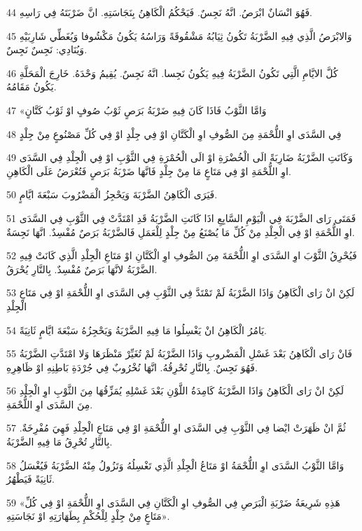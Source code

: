 \par 44 فَهُوَ انْسَانٌ ابْرَصُ. انَّهُ نَجِسٌ. فَيَحْكُمُ الْكَاهِنُ بِنَجَاسَتِهِ. انَّ ضَرْبَتَهُ فِي رَاسِهِ.
\par 45 وَالابْرَصُ الَّذِي فِيهِ الضَّرْبَةُ تَكُونُ ثِيَابُهُ مَشْقُوقَةً وَرَاسُهُ يَكُونُ مَكْشُوفا وَيُغَطِّي شَارِبَيْهِ وَيُنَادِي: نَجِسٌ نَجِسٌ.
\par 46 كُلَّ الايَّامِ الَّتِي تَكُونُ الضَّرْبَةُ فِيهِ يَكُونُ نَجِسا. انَّهُ نَجِسٌ. يُقِيمُ وَحْدَهُ. خَارِجَ الْمَحَلَّةِ يَكُونُ مَقَامُهُ.
\par 47 «وَامَّا الثَّوْبُ فَاذَا كَانَ فِيهِ ضَرْبَةُ بَرَصٍ ثَوْبُ صُوفٍ اوْ ثَوْبُ كَتَّانٍ
\par 48 فِي السَّدَى اوِ اللُّحْمَةِ مِنَ الصُّوفِ اوِ الْكَتَّانِ اوْ فِي جِلْدٍ اوْ فِي كُلِّ مَصْنُوعٍ مِنْ جِلْدٍ
\par 49 وَكَانَتِ الضَّرْبَةُ ضَارِبَةً الَى الْخُضْرَةِ اوْ الَى الْحُمْرَةِ فِي الثَّوْبِ اوْ فِي الْجِلْدِ فِي السَّدَى اوِ اللُّحْمَةِ اوْ فِي مَتَاعٍ مَا مِنْ جِلْدٍ فَانَّهَا ضَرْبَةُ بَرَصٍ فَتُعْرَضُ عَلَى الْكَاهِنِ.
\par 50 فَيَرَى الْكَاهِنُ الضَّرْبَةَ وَيَحْجِزُ الْمَضْرُوبَ سَبْعَةَ ايَّامٍ.
\par 51 فَمَتَى رَاى الضَّرْبَةَ فِي الْيَوْمِ السَّابِعِ اذَا كَانَتِ الضَّرْبَةُ قَدِ امْتَدَّتْ فِي الثَّوْبِ فِي السَّدَى اوِ اللُّحْمَةِ اوْ فِي الْجِلْدِ مِنْ كُلِّ مَا يُصْنَعُ مِنْ جِلْدٍ لِلْعَمَلِ فَالضَّرْبَةُ بَرَصٌ مُفْسِدٌ. انَّهَا نَجِسَةٌ.
\par 52 فَيُحْرِقُ الثَّوْبَ اوِ السَّدَى اوِ اللُّحْمَةَ مِنَ الصُّوفِ اوِ الْكَتَّانِ اوْ مَتَاعِ الْجِلْدِ الَّذِي كَانَتْ فِيهِ الضَّرْبَةُ لانَّهَا بَرَصٌ مُفْسِدٌ. بِالنَّارِ يُحْرَقُ.
\par 53 لَكِنْ انْ رَاى الْكَاهِنُ وَاذَا الضَّرْبَةُ لَمْ تَمْتَدَّ فِي الثَّوْبِ فِي السَّدَى اوِ اللُّحْمَةِ اوْ فِي مَتَاعِ الْجِلْدِ
\par 54 يَامُرُ الْكَاهِنُ انْ يَغْسِلُوا مَا فِيهِ الضَّرْبَةُ وَيَحْجِزُهُ سَبْعَةَ ايَّامٍ ثَانِيَةً.
\par 55 فَانْ رَاى الْكَاهِنُ بَعْدَ غَسْلِ الْمَضْروبِ وَاذَا الضَّرْبَةُ لَمْ تُغَيِّرْ مَنْظَرَهَا وَلا امْتَدَّتِ الضَّرْبَةُ فَهُوَ نَجِسٌ. بِالنَّارِ تُحْرِقُهُ. انَّهَا نُخْرُوبٌ فِي جُرْدَةِ بَاطِنِهِ اوْ ظَاهِرِهِ.
\par 56 لَكِنْ انْ رَاى الْكَاهِنُ وَاذَا الضَّرْبَةُ كَامِدَةُ اللَّوْنِ بَعْدَ غَسْلِهِ يُمَزِّقُهَا مِنَ الثَّوْبِ اوِ الْجِلْدِ مِنَ السَّدَى اوِ اللُّحْمَةِ.
\par 57 ثُمَّ انْ ظَهَرَتْ ايْضا فِي الثَّوْبِ فِي السَّدَى اوِ اللُّحْمَةِ اوْ فِي مَتَاعِ الْجِلْدِ فَهِيَ مُفْرِخَةٌ. بِالنَّارِ تُحْرِقُ مَا فِيهِ الضَّرْبَةُ.
\par 58 وَامَّا الثَّوْبُ السَّدَى اوِ اللُّحْمَةُ اوْ مَتَاعُ الْجِلْدِ الَّذِي تَغْسِلُهُ وَتَزُولُ مِنْهُ الضَّرْبَةُ فَيُغْسَلُ ثَانِيَةً فَيَطْهُرُ.
\par 59 «هَذِهِ شَرِيعَةُ ضَرْبَةِ الْبَرَصِ فِي الصُّوفِ اوِ الْكَتَّانِ فِي السَّدَى اوِ اللُّحْمَةِ اوْ فِي كُلِّ مَتَاعٍ مِنْ جِلْدٍ لِلْحُكْمِ بِطَهَارَتِهِ اوْ نَجَاسَتِهِ».


